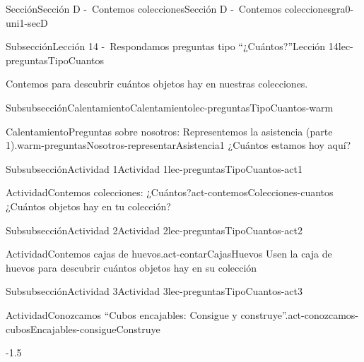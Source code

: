 \documentclass[twoside,10pt,]{article}
\begin{document}
\begin{sectionptx}{Sección}{Sección D -~Contemos colecciones}{}{Sección D -~Contemos colecciones}{}{}{gra0-uni1-secD}
\begin{subsectionptx}{Subsección}{Lección 14 -~Respondamos preguntas tipo “¿Cuántos?”}{}{Lección 14}{}{}{lec-preguntasTipoCuantos}
\begin{introduction}{}%
Contemos para descubrir cuántos objetos hay en nuestras colecciones.%
\end{introduction}%
%
%
\typeout{************************************************}
\typeout{************************************************}
%
\begin{subsubsectionptx}{Subsubsección}{Calentamiento}{}{Calentamiento}{}{}{lec-preguntasTipoCuantos-warm}
\begin{exploration}{Calentamiento}{Preguntas sobre nosotros: Representemos la asistencia (parte 1).}{warm-preguntasNosotros-representarAsistencia1}%
¿Cuántos estamos hoy aquí?%
\end{exploration}%
\end{subsubsectionptx}
%
%
\typeout{************************************************}
\typeout{************************************************}
%
\begin{subsubsectionptx}{Subsubsección}{Actividad 1}{}{Actividad 1}{}{}{lec-preguntasTipoCuantos-act1}
\begin{activity}{Actividad}{Contemos colecciones: ¿Cuántos?}{act-contemosColecciones-cuantos}%
¿Cuántos objetos hay en tu colección?%
\end{activity}%
\end{subsubsectionptx}
%
%
\typeout{************************************************}
\typeout{************************************************}
%
\begin{subsubsectionptx}{Subsubsección}{Actividad 2}{}{Actividad 2}{}{}{lec-preguntasTipoCuantos-act2}
\begin{activity}{Actividad}{Contemos cajas de huevos.}{act-contarCajasHuevos}%
Usen la caja de huevos para descubrir cuántos objetos hay en su colección%
\end{activity}%
\end{subsubsectionptx}
%
%
\typeout{************************************************}
\typeout{************************************************}
%
\begin{subsubsectionptx}{Subsubsección}{Actividad 3}{}{Actividad 3}{}{}{lec-preguntasTipoCuantos-act3}
\begin{activity}{Actividad}{Conozcamos “Cubos encajables: Consigue y construye”.}{act-conozcamos-cubosEncajables-consigueConstruye}%
\begin{image}{0}{1}{0}{-1.5\baselineskip}%

\end{image}
\end{activity}
\end{subsubsectionptx}
\end{subsectionptx}
\end{sectionptx}
\end{document}
